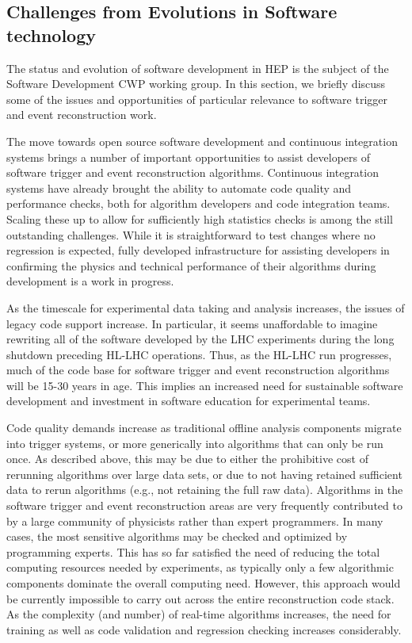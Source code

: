 \subsection{Challenges from Evolutions in Software technology}

The status and evolution of software development in HEP is the subject of the Software Development CWP working group. In this section, we briefly discuss some of the issues and opportunities of 
particular relevance to software trigger and event reconstruction work.

The move towards open source software development and continuous integration systems brings a number of important opportunities to assist developers of software trigger and event reconstruction 
algorithms. Continuous integration systems have already brought the ability to automate code quality and performance checks, both for algorithm developers and code integration teams. Scaling 
these up to allow for sufficiently high statistics checks is among the still outstanding challenges. While it is straightforward to test changes where no regression is expected, fully developed 
infrastructure for assisting developers in confirming the physics and technical performance of their algorithms during development is a work in progress.

As the timescale for experimental data taking and analysis increases, the issues of legacy code support increase. In particular, it seems unaffordable to imagine rewriting all of the software 
developed by the LHC experiments during the long shutdown preceding HL-LHC operations. Thus, as the HL-LHC run progresses, much of the code base for software trigger and event reconstruction 
algorithms will be 15-30 years in age. This implies an increased need for sustainable software development and investment in software education for experimental teams.

Code quality demands increase as traditional offline analysis components migrate into trigger systems, or more generically into algorithms that can only be run once. As described above, 
this may be due to either the prohibitive cost of rerunning algorithms over large data sets, or due to not having retained sufficient data to rerun algorithms (e.g., not retaining the full 
raw data). Algorithms in the software trigger and event reconstruction areas are very frequently contributed to by a large community of physicists rather than expert programmers. In many 
cases, the most sensitive algorithms may be checked and optimized by programming experts. This has so far satisfied the need of reducing the total computing resources needed by experiments, 
as typically only a few algorithmic components dominate the overall computing need. However, this approach would be currently impossible to carry out across the entire reconstruction code 
stack. As the complexity (and number) of real-time algorithms increases, the need for training as well as code validation and regression checking increases considerably. 

